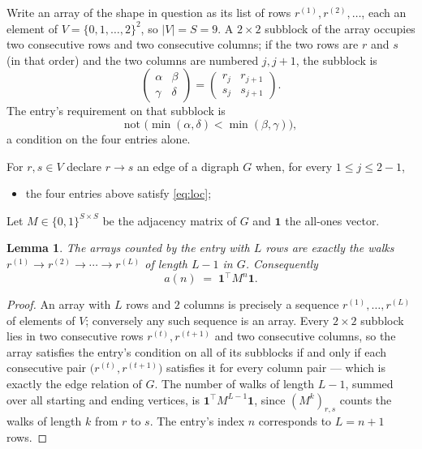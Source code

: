 \documentclass[11pt,a4paper]{article}
\theoremstyle{plain}
\newtheorem{lemma}[theorem]{Lemma}
\theoremstyle{definition}
\begin{document}
Write an array of the shape in question as its list of rows
$r^{(1)},r^{(2)},\dots$, each an element of
$V=\{0,1,\dots,2\}^{2}$, so $|V|=S=9$. A $2\times2$ subblock of the array
occupies two consecutive rows and two consecutive columns; if the two rows are $r$
and $s$ (in that order) and the two columns are numbered $j,j+1$,
the subblock is
\[
\begin{pmatrix}\alpha&\beta\\\gamma&\delta\end{pmatrix}=\begin{pmatrix}r_j&r_{j+1}\\s_j&s_{j+1}\end{pmatrix}.
\]
The entry's requirement on that subblock is
\begin{equation}\label{eq:loc}
\text{not }\bigl(\min(\alpha,\delta)<\min(\beta,\gamma)\bigr),
\end{equation}
a condition on the four entries alone.

For $r,s\in V$ declare $r\to s$ an edge of a digraph $G$ when, for every
$1\le j\le 2-1$,
\begin{itemize}
\item the four entries above satisfy \eqref{eq:loc};

\end{itemize}
Let $M\in\{0,1\}^{S\times S}$ be the adjacency matrix of $G$ and $\mathbf{1}$ the
all-ones vector.

\begin{lemma}\label{lem:walk}
The arrays counted by the entry with $L$ rows are exactly the walks
$r^{(1)}\to r^{(2)}\to\cdots\to r^{(L)}$ of length $L-1$ in $G$. Consequently
\[
a(n)\;=\;\mathbf{1}^{\!\top}M^{n}\mathbf{1} .
\]
\end{lemma}

\begin{proof}
An array with $L$ rows and $2$ columns is precisely a sequence
$r^{(1)},\dots,r^{(L)}$ of elements of $V$; conversely any such sequence is an array.
Every $2\times2$ subblock lies in two consecutive rows $r^{(t)},r^{(t+1)}$ and two
consecutive columns, so the array satisfies the entry's condition on all of its subblocks
if and only if each consecutive pair $\bigl(r^{(t)},r^{(t+1)}\bigr)$ satisfies it for
every column pair --- which is exactly the edge relation of $G$. The number of walks of
length $L-1$, summed over all starting and ending vertices, is
$\mathbf{1}^{\!\top}M^{L-1}\mathbf{1}$, since $(M^{k})_{r,s}$ counts the walks of
length $k$ from $r$ to $s$. The entry's index $n$ corresponds to $L=n+1$ rows.
\end{proof}
\end{document}
